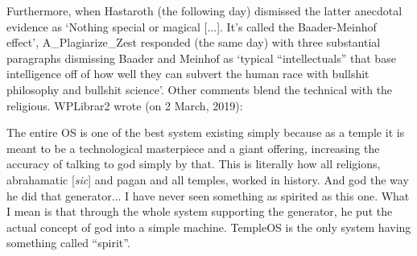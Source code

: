 \documentclass[Draft.tex]{subfiles}
\begin{document}
Furthermore, when Hastaroth (the following day) dismissed
the latter anecdotal evidence as `Nothing special or magical [...].
It's called the Baader-Meinhof effect', A\_Plagiarize\_Zest responded
(the same day) with three substantial paragraphs dismissing Baader and Meinhof
as `typical ``intellectuals'' that base intelligence off of
how well they can subvert the human race
with bullshit philosophy and bullshit science'.
Other comments blend the technical with the religious.
WPLibrar2 wrote (on 2 March, 2019):
\begin{displayquote}
	The entire OS is one of the best system existing simply because
	as a temple it is meant to be a technological masterpiece
	and a giant offering, increasing the accuracy
	of talking to god simply by that.
	This is literally how all religions, abrahamatic [\textit{sic}] and pagan
	and all temples, worked in history.
	And god the way he did that generator...
	I have never seen something as spirited as this one.
	What I mean is that through the whole system supporting the generator,
	he put the actual concept of god into a simple machine.
	TempleOS is the only system having something called ``spirit''.
\end{displayquote}

\end{document}

